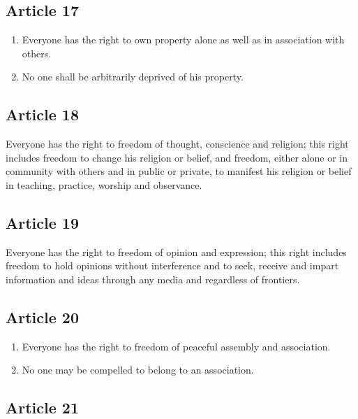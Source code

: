 \documentclass[
  ngerman,
  american,
  titlepage,
  openright,
  DIV=calc,
  toc=listof,
  listof=nochaptergap]{scrbook}
\begin{document}
\subsection{Article 17}\label{article-17-3}

\begin{enumerate}
\def\labelenumi{\arabic{enumi}.}
\item
  Everyone has the right to own property alone as well as in association
  with others.
\item
  No one shall be arbitrarily deprived of his property.
\end{enumerate}

\subsection{Article 18}\label{article-18-3}

Everyone has the right to freedom of thought, conscience and religion;
this right includes freedom to change his religion or belief, and
freedom, either alone or in community with others and in public or
private, to manifest his religion or belief in teaching, practice,
worship and observance.

\subsection{Article 19}\label{article-19-3}

Everyone has the right to freedom of opinion and expression; this right
includes freedom to hold opinions without interference and to seek,
receive and impart information and ideas through any media and
regardless of frontiers.

\subsection{Article 20}\label{article-20-3}

\begin{enumerate}
\def\labelenumi{\arabic{enumi}.}
\item
  Everyone has the right to freedom of peaceful assembly and
  association.
\item
  No one may be compelled to belong to an association.
\end{enumerate}

\subsection{Article 21}\label{article-21-3}
\end{document}
